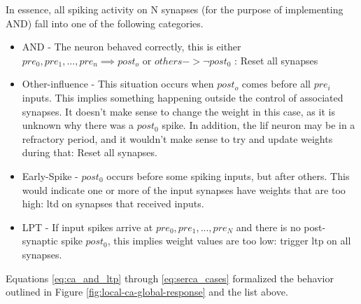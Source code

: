 


In essence, all spiking activity on N synapses (for the purpose of implementing
AND) fall into one of the following categories.
\begin{itemize}
\item AND - The neuron behaved correctly, this is either $pre_0, pre_1, ...,
  pre_n \implies post_o$ or $others -> \neg post_0$ : Reset all synapses
\item Other-influence - This situation occurs when $post_o$ comes before all
  $pre_i$ inputs. This implies something happening outside the control of
  associated synapses. It doesn't make sense to change the weight in this case,
  as it is unknown why there was a $post_0$ spike. In addition, the \Gls{lif} neuron
  may be in a refractory period, and it wouldn't make sense to try and update
  weights during that: Reset all synapses.
\item Early-Spike - $post_0$ occurs before some spiking inputs, but after
  others. This would indicate one or more of the input synapses have weights
  that are too high: \Gls{ltd} on synapses that received inputs.
\item LPT - If input spikes arrive at $pre_0, pre_1, ..., pre_N$ and there is no
  post-synaptic spike $post_0$, this implies weight values are too low: trigger
  \Gls{ltp} on all synapses.
\end{itemize}

Equations \ref{eq:ca_and_ltp} through \ref{eq:serca_cases} formalized the behavior outlined
in Figure \ref{fig:local-ca-global-response} and the list above.

